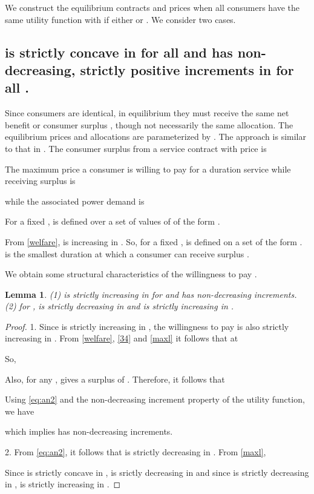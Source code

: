 \documentclass[10pt,draftcls,onecolumn]{IEEEtran}
\newtheorem{lemma}{Lemma}
\newcounter{l1}
\newcounter{l2}
\newcounter{l3}
\begin{document}
We construct the equilibrium  contracts and prices when all consumers have the same utility function  with  if either  or . We consider  two cases.


\subsection{ is strictly concave in  for all  and has non-decreasing, strictly positive increments in  for all .}\label{sec:4a}


Since consumers are identical, in equilibrium they must receive the same net benefit or consumer surplus , though not necessarily the same allocation.  The equilibrium prices and allocations   are parameterized by .  The approach is similar to that in  \cite{tanvar93}. The consumer surplus from a service contract  with price  is

 The maximum price a consumer is willing to pay for a duration  service while receiving surplus  is 

while the associated power demand is

For a fixed ,  is defined over a set of values of  of the form .

From \eqref{welfare},  is increasing in .  So, for a fixed ,  is defined on a set of the form
.   is the smallest duration at which a consumer can receive surplus .  


We obtain some structural characteristics of the willingness to pay .




\begin{lemma} \label{L2}
(1)  is  strictly increasing in  for  and has non-decreasing increments. (2)  for ,  is strictly decreasing in  and   is strictly increasing in .
 \end{lemma}
\begin{proof}  1. Since  is strictly increasing in , the willingness to pay is also strictly increasing in .  From \eqref{welfare}, \eqref{34} and \eqref{maxl} it follows that at 

So,

Also, for any ,  gives a surplus of . Therefore, it follows that 

Using \eqref{eq:an2} and the non-decreasing increment property of the utility function, we have

which implies  has non-decreasing increments.  

2. From \eqref{eq:an2}, it follows that  is strictly decreasing in . From \eqref{maxl},

Since  is strictly concave in ,  is srictly decreasing in  and since  is strictly
decreasing in ,  is strictly increasing in .
\end{proof}
\end{document}
